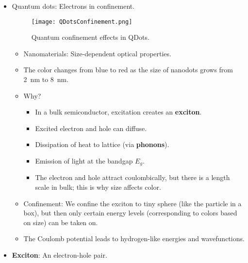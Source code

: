 \documentclass[../notes.tex]{subfiles}
\begin{document}
\begin{itemize}
    \item Quantum dots: Electrons in confinement.
    \begin{figure}[H]
        \centering
        \texttt{[image: QDotsConfinement.png]}
        \caption{Quantum confinement effects in QDots.}
        \label{fig:QDotsConfinement}
    \end{figure}
    \begin{itemize}
        \item Nanomaterials: Size-dependent optical properties.
        \item The color changes from blue to red as the size of  nanodots grows from \SI{2}{\nano\meter} to \SI{8}{\nano\meter}.
        \item Why?
        \begin{itemize}
            \item In a bulk semiconductor, excitation creates an \textbf{exciton}.
            \item Excited electron and hole can diffuse.
            \item Dissipation of heat to lattice (via \textbf{phonons}).
            \item Emission of light at the bandgap $E_g$.
            \item The electron and hole attract coulombically, but there is a length scale in bulk; this is why size affects color.
        \end{itemize}
        \item Confinement: We confine the exciton to tiny sphere (like the particle in a box), but then only certain energy levels (corresponding to colors based on size) can be taken on.
        \item The Coulomb potential leads to hydrogen-like energies and wavefunctions.
    \end{itemize}
    \item \textbf{Exciton}: An electron-hole pair.
\end{itemize}
\end{document}
